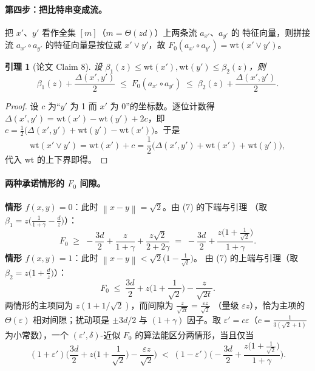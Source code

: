 \documentclass[UTF8, 11pt, a4paper, linestretch=1.15]{ctexart}
\theoremstyle{zhstyle}
\newtheorem{lemma}{引理}
\newcommand{\eps}{\varepsilon}
\newcommand{\Fzero}{F_0}
\newcommand{\norm}[1]{\left\lVert #1 \right\rVert}
\begin{document}
	\paragraph{第四步：把比特串变成流。}
	把 $x'$、$y'$ 看作全集 $[m]$（$m = \Theta(zd)$）上两条流 $a_{x'}$、$a_{y'}$ 的
	特征向量，则拼接流 $a_{x'} \circ a_{y'}$ 的特征向量是按位或 $x' \vee y'$，故
	$\Fzero(a_{x'} \circ a_{y'}) = \mathrm{wt}(x' \vee y')$。
	
	\begin{lemma}[论文 Claim 8]
		设 $\beta_1(z) \leq \mathrm{wt}(x'), \mathrm{wt}(y') \leq \beta_2(z)$，则
		\[
		\beta_1(z) + \frac{\Delta(x', y')}{2} \;\leq\; \Fzero(a_{x'} \circ a_{y'})
		\;\leq\; \beta_2(z) + \frac{\Delta(x', y')}{2}.
		\]
	\end{lemma}
	
	\begin{proof}
		设 $c$ 为“$y'$ 为 1 而 $x'$ 为 0”的坐标数。逐位计数得
		$\Delta(x', y') = \mathrm{wt}(x') - \mathrm{wt}(y') + 2c$，即
		$c = \frac{1}{2}\big(\Delta(x',y') + \mathrm{wt}(y') - \mathrm{wt}(x')\big)$。于是
		\[
		\mathrm{wt}(x' \vee y') = \mathrm{wt}(x') + c
		= \frac{1}{2}\big(\Delta(x', y') + \mathrm{wt}(x') + \mathrm{wt}(y')\big),
		\]
		代入 $\mathrm{wt}$ 的上下界即得。
	\end{proof}
	
	\paragraph{两种承诺情形的 $\Fzero$ 间隙。}
	\textbf{情形 $f(x,y) = 0$}：此时 $\norm{x - y} = \sqrt{2}$。由 (7) 的下端与引理
	（取 $\beta_1 = z\big(\frac{1}{1+\gamma} - \frac{d}{z}\big)$）：
	\[
	\Fzero \;\geq\; -\frac{3d}{2} + \frac{z}{1+\gamma} + \frac{z\sqrt{2}}{2+2\gamma}
	\;=\; -\frac{3d}{2} + \frac{z\big(1 + \frac{1}{\sqrt{2}}\big)}{1+\gamma}.
	\]
	\textbf{情形 $f(x,y) = 1$}：此时 $\norm{x-y} < \sqrt{2}\big(1 - \frac{1}{\sqrt{t}}\big)$。
	由 (7) 的上端与引理（取 $\beta_2 = z\big(1 + \frac{d}{z}\big)$）：
	\[
	\Fzero \;\leq\; \frac{3d}{2} + z\Big(1 + \frac{1}{\sqrt{2}}\Big)
	- \frac{z}{\sqrt{2t}}.
	\]
	两情形的主项同为 $z(1 + 1/\sqrt{2})$，而间隙为 $\frac{z}{\sqrt{2t}} = \frac{\eps z}{\sqrt{2}}$
	（量级 $\eps z$），恰为主项的 $\Theta(\eps)$ 相对间隙；扰动项是 $\pm 3d/2$ 与
	$(1+\gamma)$ 因子。取 $\eps' = c\eps$（$c = \frac{1}{3(\sqrt{2}+1)}$ 为小常数），一个
	$(\eps', \delta)$-近似 $\Fzero$ 的算法能区分两情形，当且仅当
	\[
	(1+\eps')\Big(\frac{3d}{2} + z\Big(1+\frac{1}{\sqrt{2}}\Big) - \frac{\eps z}{\sqrt{2}}\Big)
	\;<\; (1-\eps')\Big(-\frac{3d}{2} + \frac{z\big(1+\frac{1}{\sqrt{2}}\big)}{1+\gamma}\Big).
	\tag{8}
	\]
	
\end{document}
